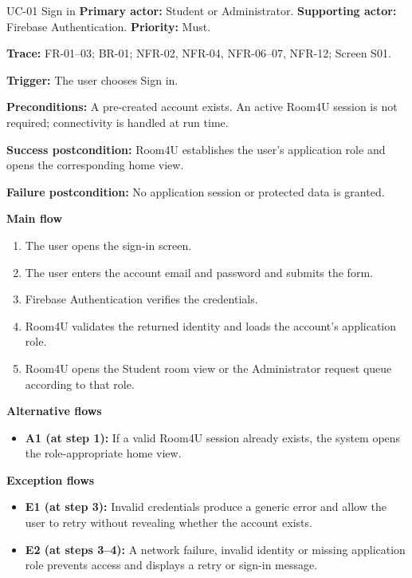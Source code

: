\begin{usecasebox}{UC-01 Sign in}
\noindent\textbf{Primary actor:} Student or Administrator.\quad
\textbf{Supporting actor:} Firebase Authentication.\quad
\textbf{Priority:} Must.\par
\textbf{Trace:} FR-01--03; BR-01; NFR-02, NFR-04, NFR-06--07, NFR-12; Screen S01.\par
\textbf{Trigger:} The user chooses Sign in.\par
\textbf{Preconditions:} A pre-created account exists. An active Room4U session is not required; connectivity is handled at run time.\par
\textbf{Success postcondition:} Room4U establishes the user's application role and opens the corresponding home view.\par
\textbf{Failure postcondition:} No application session or protected data is granted.\par
\textbf{Main flow}
\begin{enumerate}[label=\arabic*.,leftmargin=2em,itemsep=1pt,topsep=2pt]
  \item The user opens the sign-in screen.
  \item The user enters the account email and password and submits the form.
  \item Firebase Authentication verifies the credentials.
  \item Room4U validates the returned identity and loads the account's application role.
  \item Room4U opens the Student room view or the Administrator request queue according to that role.
\end{enumerate}
\textbf{Alternative flows}
\begin{itemize}[label={},leftmargin=0pt,itemsep=1pt,topsep=1pt]
  \item \textbf{A1 (at step 1):} If a valid Room4U session already exists, the system opens the role-appropriate home view.
\end{itemize}
\textbf{Exception flows}
\begin{itemize}[label={},leftmargin=0pt,itemsep=1pt,topsep=1pt]
  \item \textbf{E1 (at step 3):} Invalid credentials produce a generic error and allow the user to retry without revealing whether the account exists.
  \item \textbf{E2 (at steps 3--4):} A network failure, invalid identity or missing application role prevents access and displays a retry or sign-in message.
\end{itemize}
\end{usecasebox}

